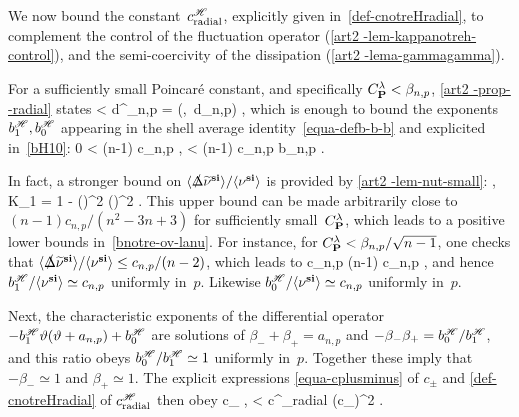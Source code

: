 \documentclass[11pt]{article}
\numberwithin{table}{section}
\numberwithin{equation}{section}
\numberwithin{table}{section}
\numberwithin{figure}{section}
\begin{document}
\medskip
\bse
{}
We now bound the constant~$c^{\mathscr{H}}_{\textnormal{radial}}$, explicitly given in~\eqref{def-cnotreHradial}, to complement the control of the fluctuation operator (\autoref{art2 -lem-kappanotreh-control}), and the semi-coercivity of the dissipation (\autoref{art2 -lema-gammagamma}).

For a sufficiently small Poincaré constant, and specifically $C_{\textnormal{\textbf{P}}}^{\lambda} < \beta_{n,p}$, \autoref{art2 -prop--radial} states
 \leq \frac{\la\Deltaslash\nut^\normal\ra}{\la\nu^\normal\ra} < d^{\min}_{n,p}
= \min \Bigl(,\, d_{n,p}\Bigr) ,
\ee
which is enough to bound the exponents $b^{\mathscr{H}}_{1},b^{\mathscr{H}}_{0}$ appearing in the shell average identity~\eqref{equa-defb-b-b} and explicited in~\eqref{bH10}:
0 <  \leq (n-1) c_{n,p} ,  <  \leq (n-1) c_{n,p} b_{n,p} .
\ee

In fact, a stronger bound on $\langle\slashed\Delta{}\widetilde\nu^{\textnormal{\textbf{si}}}\rangle/\langle\nu^{\textnormal{\textbf{si}}}\rangle$ is provided by \autoref{art2 -lem-nut-small}:
 \leq \frac{\la\Deltaslash\nut^\normal\ra}{\la\nu^\normal\ra} \leq {} ,
\qquad
K_{1\Poin} = 1 - (\tcnp)^2 (\CPoin)^2 .
\ee
This upper bound can be made arbitrarily close to $(n-1)c_{n,p}/(n^2 -3n+3)$ for sufficiently small~$C_{\textnormal{\textbf{P}}}^{\lambda}$, which leads to a positive lower bounds in~\eqref{bnotre-ov-lanu}.
For instance, for $C_{\textnormal{\textbf{P}}}^{\lambda} < \beta_{n,p} / \sqrt{n-1}$, one checks that $\langle\slashed\Delta{}\widetilde\nu^{\textnormal{\textbf{si}}}\rangle / \langle\nu^{\textnormal{\textbf{si}}}\rangle \leq c_{n,p}/(n-2)$, which leads to
\be
c_{n,p} \leq {} \leq (n-1) c_{n,p} ,
\ee
and hence $b^{\mathscr{H}}_{1}/\langle\nu^{\textnormal{\textbf{si}}}\rangle\simeq c_{n,p}$ uniformly in~$p$.  Likewise $b^{\mathscr{H}}_{0}/\langle\nu^{\textnormal{\textbf{si}}}\rangle\simeq c_{n,p}$ uniformly in~$p$.

Next, the characteristic exponents of the differential operator $-b^{\mathscr{H}}_{1}\vartheta(\vartheta+a_{n,p})+b^{\mathscr{H}}_{0}$ are solutions of $\beta_- + \beta_+ = a_{n,p}$ and $-\beta_- \beta_+= b^{\mathscr{H}}_{0}/b^{\mathscr{H}}_{1}$, and this ratio obeys $b^{\mathscr{H}}_{0}/b^{\mathscr{H}}_{1}\simeq 1$ uniformly in~$p$.
Together these imply that $-\beta_- \simeq 1$ and $\beta_+ \simeq 1$.
The explicit expressions \eqref{equa-cplusminus} of $c_\pm$ and \eqref{def-cnotreHradial} of $c^{\mathscr{H}}_{\textnormal{radial}}$ then obey
\be
c_\pm \lesssim {} ,  < c^{\notreH}_{\textnormal{radial}} \lesssim (c_\pm)^2 \lesssim {} .
\ee
\ese
\end{document}
